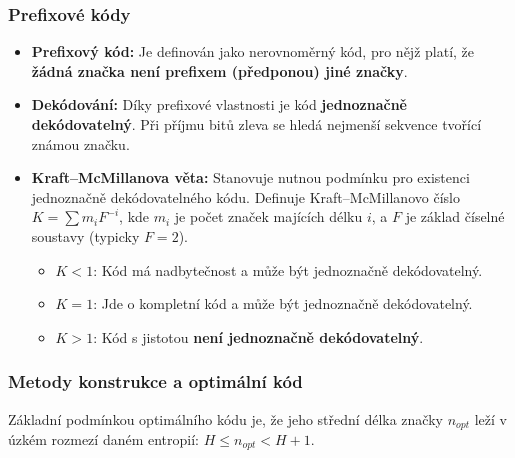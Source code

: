     \subsubsection{Prefixové kódy}
        \begin{itemize}
            \item \textbf{Prefixový kód:} Je definován jako nerovnoměrný kód, pro nějž platí, že \textbf{žádná značka není prefixem (předponou) jiné značky}.
            \item \textbf{Dekódování:} Díky prefixové vlastnosti je kód \textbf{jednoznačně dekódovatelný}. Při příjmu bitů zleva se hledá nejmenší sekvence tvořící známou značku.
            \item \textbf{Kraft--McMillanova věta:} Stanovuje nutnou podmínku pro existenci jednoznačně dekódovatelného kódu. Definuje Kraft--McMillanovo číslo $K = \sum m_i F^{-i}$, kde $m_i$ je počet značek majících délku $i$, a $F$ je základ číselné soustavy (typicky $F = 2$).
            \begin{itemize}
                \item $K < 1$: Kód má nadbytečnost a může být jednoznačně dekódovatelný.
                \item $K = 1$: Jde o kompletní kód a může být jednoznačně dekódovatelný.
                \item $K > 1$: Kód s jistotou \textbf{není jednoznačně dekódovatelný}.
            \end{itemize}
        \end{itemize}
    \subsubsection{Metody konstrukce a optimální kód}

        Základní podmínkou optimálního kódu je, že jeho střední délka značky $n_{opt}$ leží v úzkém rozmezí daném entropií: $H \le n_{opt} < H + 1$.

